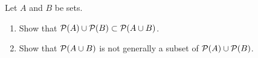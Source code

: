 \begin{exercise}\label{power:union}
Let $A$ and $B$ be sets.
\begin{enumerate}
\item\label{union:true} Show that ${\cal P}(A)\cup {\cal P}(B)\subset {\cal P}(A\cup B)$.
\item Show that ${\cal P}(A\cup B)$ is not generally a subset of ${\cal P}(A)\cup{\cal P}(B)$.
\end{enumerate}
\end{exercise}

\clearpage
